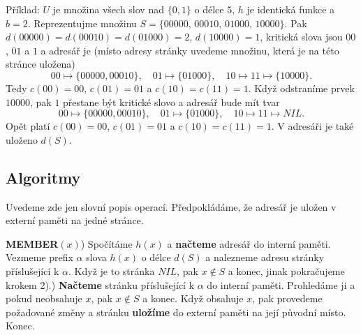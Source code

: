 \documentclass[a4paper,12pt]{article}
\begin{document}
Příklad: $U$ je množina všech slov nad $\{
0,1\}$ o 
délce $5$, $h$ 
je identická funkce a $b=2$. Reprezentujme množinu  
$S=\{00000,\,00010,\,01000,\,10000\}$. Pak 
$d(00000)=d(00010)=d(01000)=2$, $d(10000)=1$, kritická slova 
jsou $00$, $01$ a $1$ a adresář je (místo adresy stránky 
uvedeme množinu, která je na této stránce uložena)
$$00\mapsto \{00000,00010\},\quad 01\mapsto \{01000\},\quad 10\mapsto 
11\mapsto \{10000\}.$$
Tedy $c(00)=00$, $c(01)=01$ a $c(10)=c(11)=1$.
Když odstraníme prvek $10000$, pak $1$ přestane být kritické 
slovo a adresář bude mít tvar
$$00\mapsto \{00000,00010\},\quad 01\mapsto \{01000\},\quad 10\mapsto 
11\mapsto NIL.$$
Opět platí $c(00)=00$, $c(01)=01$ a $c(10)=c(11)=1$.
V adresáři je také uloženo $d(S)$.

\subsection{
Algoritmy
}


Uvedeme zde jen slovní popis operací. Předpokládáme, že adresář 
je uložen v externí paměti na jedné stránce.

{\bf MEMBER$(x)$}) Spočítáme $h(x)$ a {\bf načteme} adresář do interní paměti. 
Vez\-me\-me prefix $\alpha$ slova $h(x)$ o délce $d(S)$ a nalezneme 
adresu stránky příslušející k $\alpha$. Když je to stránka 
$NIL$, pak $x\notin S$ a konec, jinak pokračujeme krokem 
2).) {\bf Načteme} stránku příslušející k $\alpha$ do interní 
paměti. Prohle\-dá\-me ji a pokud neobsahuje $x$, pak $x\notin 
S$ a 
konec. Když obsahuje $x$, pak provedeme požadované 
změny a stránku {\bf ulo\-ží\-me} do externí paměti na její 
původní místo. Konec.
\end{document}
